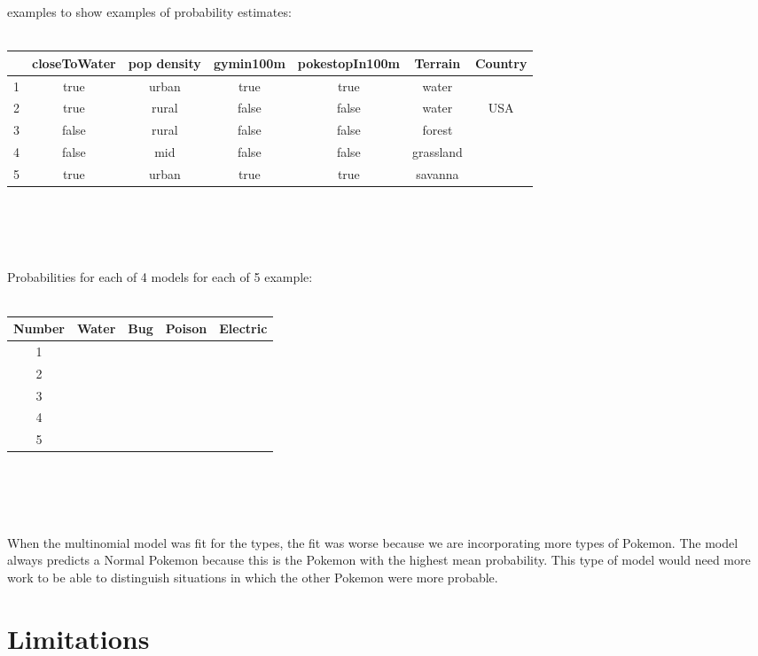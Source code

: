 \documentclass{article}
\begin{document}
\newpage
{} examples to show examples of probability estimates: \\ 
\\ 
\begin{tabular}{ | c | c | c | c | c | c | c |}
	\hline
	& closeToWater & pop density & gymin100m & pokestopIn100m & Terrain & Country \\ 
	\hline
	1  & true & urban & true & true & water & \\
	2  & true & rural & false & false & water & USA \\  
	3  & false & rural & false & false & forest & \\  
	4  & false & mid & false & false & grassland &\\
	5  & true & urban  & true & true & savanna & \\ 
	\hline
\end{tabular} \\ 
\\ 
\\ 
\\ 
Probabilities for each of 4 models for each of 5 example: \\
\\  
\begin{tabular}{c | c | c | c | c}
	Number & Water & Bug & Poison & Electric \\ 
	\hline
	1 & & & & \\
	2 & & & & \\ 
	3 & & & & \\ 
	4 & & & & \\ 
	5 & & & & \\  	
\end{tabular}\\ 
\\ \\ \\ 
When the multinomial model was fit for the types, the fit was worse because we are incorporating more types of Pokemon. The model always predicts a Normal Pokemon because this is the Pokemon with the highest mean probability. This type of model would need more work to be able to distinguish situations in which the other Pokemon were more probable.

\section{Limitations}
\end{document}
